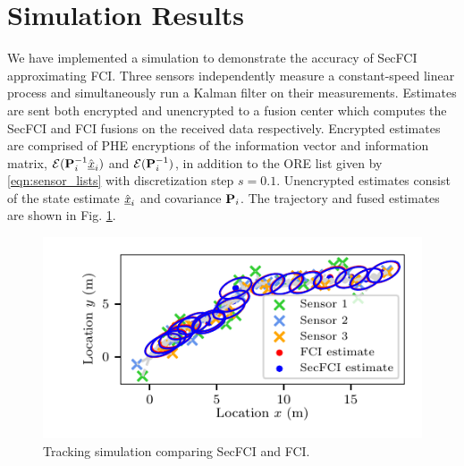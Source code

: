 \documentclass[letterpaper, 10 pt, journal, twoside]{ieeetran}  %
\begin{document}



\section{Simulation Results} \label{sec:results}
We have implemented a simulation to demonstrate the accuracy of SecFCI approximating FCI. Three sensors independently measure a constant-speed linear process and simultaneously run a Kalman filter on their measurements. Estimates are sent both encrypted and unencrypted to a fusion center which computes the SecFCI and FCI fusions on the received data respectively. Encrypted estimates are comprised of PHE encryptions of the information vector and information matrix, $\mathcal{E}({{\mathbf{P}}}^{-1}_i\hat{{\underline{x}}}_i)$ and $\mathcal{E}({{\mathbf{P}}}^{-1}_i)$, in addition to the ORE list given by \eqref{eqn:sensor_lists} with discretization step $s=0.1$. Unencrypted estimates consist of the state estimate $\hat{{\underline{x}}}_i$ and covariance ${{\mathbf{P}}}_i$. The trajectory and fused estimates are shown in Fig. \ref{fig:fci_secfci_traj}.
\begin{figure}[tb]
   \vspace{-10pt}
   \begin{center}
      \includegraphics{images/fci_secfci_cmp.pdf}
   \end{center}
   \vspace{-15pt}
   \caption{Tracking simulation comparing SecFCI and FCI.}
   \vspace{-\baselineskip}
   \label{fig:fci_secfci_traj}
\end{figure}
\end{document}

